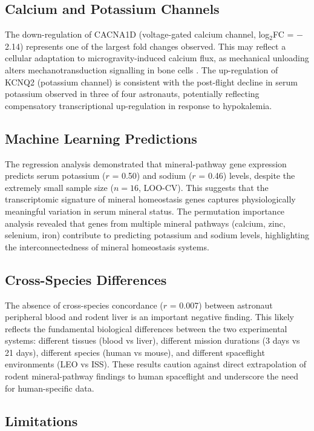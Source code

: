 \documentclass[11pt,a4paper]{article}
\begin{document}
\subsection{Calcium and Potassium Channels}

The down-regulation of CACNA1D (voltage-gated calcium channel, log$_2$FC = $-$2.14) represents one of the largest fold changes observed. This may reflect a cellular adaptation to microgravity-induced calcium flux, as mechanical unloading alters mechanotransduction signalling in bone cells \citep{hughesfulford2004}. The up-regulation of KCNQ2 (potassium channel) is consistent with the post-flight decline in serum potassium observed in three of four astronauts, potentially reflecting compensatory transcriptional up-regulation in response to hypokalemia.

\subsection{Machine Learning Predictions}

The regression analysis demonstrated that mineral-pathway gene expression predicts serum potassium ($r$ = 0.50) and sodium ($r$ = 0.46) levels, despite the extremely small sample size ($n=16$, LOO-CV). This suggests that the transcriptomic signature of mineral homeostasis genes captures physiologically meaningful variation in serum mineral status. The permutation importance analysis revealed that genes from multiple mineral pathways (calcium, zinc, selenium, iron) contribute to predicting potassium and sodium levels, highlighting the interconnectedness of mineral homeostasis systems.

\subsection{Cross-Species Differences}

The absence of cross-species concordance ($r$ = 0.007) between astronaut peripheral blood and rodent liver is an important negative finding. This likely reflects the fundamental biological differences between the two experimental systems: different tissues (blood vs liver), different mission durations (3 days vs 21 days), different species (human vs mouse), and different spaceflight environments (LEO vs ISS). These results caution against direct extrapolation of rodent mineral-pathway findings to human spaceflight and underscore the need for human-specific data.

\subsection{Limitations}
\end{document}

